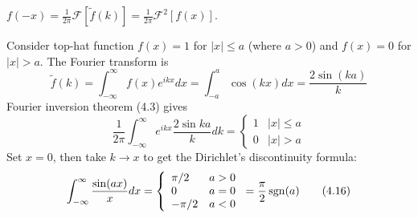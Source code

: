 \documentclass[a4paper]{article}
\begin{document}
\begin{cor}
$f(-x)=\frac{1}{2\pi}\mathcal{F}[\tilde{f}(k)]=\frac{1}{2\pi}\mathcal{F}^2[f(x)]$.
\end{cor}
\begin{eg}
Consider top-hat function $f(x)=1$ for $|x|\leq a$ (where $a>0$) and $f(x)=0$ for $|x|>a$. The Fourier transform is
\begin{equation}
    \tilde{f}(k)=\int_{-\infty}^\infty f(x)e^{ikx}dx=\int_{-a}^a\cos(kx)dx=\frac{2\sin(ka)}{k}\tag{4.15}
\end{equation}
Fourier inversion theorem (4.3) gives
$$   \frac{1}{2\pi}\int_{-\infty}^\infty e^{ikx}\frac{2\sin ka}{k}dk=
\left\{
        \begin{array}{ll}
      1 & |x|\leq a\\
      0 & |x|>a
        \end{array}
    \right.$$
Set $x=0$, then take $k\rightarrow x$ to get the Dirichlet's discontinuity formula:
\begin{equation}
    \int_{-\infty}^\infty\frac{\sin(ax)}{x}dx=\left\{
        \begin{array}{ll}
      \pi/2 & a>0\\
      0 & a=0\\
      -\pi/2 & a<0
        \end{array}
    \right.=\frac{\pi}{2}\operatorname{sgn}(a)\tag{4.16}
\end{equation}
\end{eg}
\end{document}

